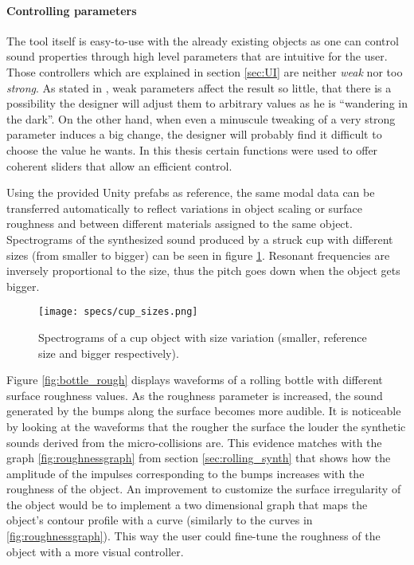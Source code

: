 \paragraph{Controlling parameters}
\hfill \break

The tool itself is easy-to-use with the already existing objects as one can control sound properties through high level parameters that are intuitive for the user. Those controllers which are explained in section \ref{sec:UI} are neither \textit{weak} nor too \textit{strong}. As stated in \cite{jaffe1995ten}, weak parameters affect the result so little, that there is a possibility the designer will adjust them to arbitrary values as he is ``wandering in the dark''. On the other hand, when even a minuscule tweaking of a very strong parameter induces a big change, the designer will probably find it difficult to choose the value he wants. In this thesis certain functions were used to offer coherent sliders that allow an efficient control.

Using the provided Unity\textsuperscript{\textregistered} prefabs as reference, the same modal data can be transferred automatically to reflect variations in object scaling or surface roughness and between different materials assigned to the same object. Spectrograms of the synthesized sound produced by a struck cup with different sizes (from smaller to bigger) can be seen in figure \ref{fig:cup_sizes}. Resonant frequencies are inversely proportional to the size, thus the pitch goes down when the object gets bigger.

\begin{figure}[H]
  \centering
    \texttt{[image: specs/cup\_sizes.png]}
      \caption{Spectrograms of a cup object with size variation (smaller, reference size and bigger respectively).}
      \label{fig:cup_sizes}
\end{figure}

Figure \ref{fig:bottle_rough} displays waveforms of a rolling bottle with different surface roughness values. As the roughness parameter is increased, the sound generated by the bumps along the surface becomes more audible. It is noticeable by looking at the waveforms that the rougher the surface the louder the synthetic sounds derived from the micro-collisions are. This evidence matches with the graph \ref{fig:roughnessgraph} from section \ref{sec:rolling_synth} that shows how the amplitude of the impulses corresponding to the bumps increases with the roughness of the object. An improvement to customize the surface irregularity of the object would be to implement a two dimensional graph that maps the object's contour profile with a curve (similarly to the curves in \ref{fig:roughnessgraph}). This way the user could fine-tune the roughness of the object with a more visual controller.

